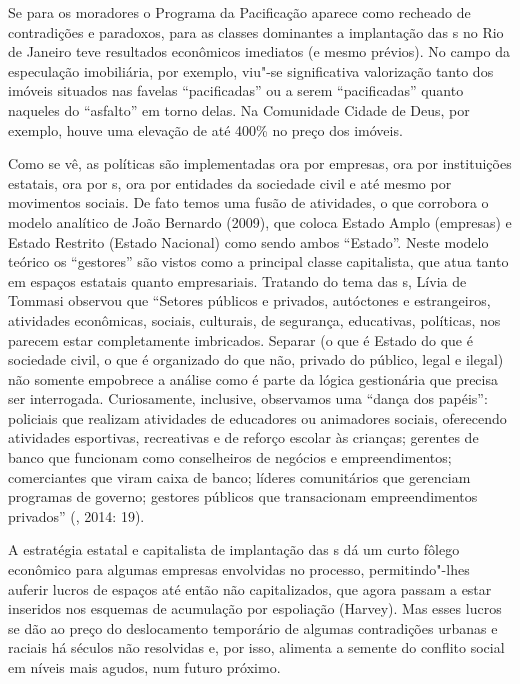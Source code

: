 Se para os moradores o Programa da Pacificação aparece como recheado de
contradições e paradoxos, para as classes dominantes a implantação das
s no Rio de Janeiro teve resultados econômicos imediatos (e mesmo
prévios). No campo da especulação imobiliária, por exemplo, viu"-se
significativa valorização tanto dos imóveis situados nas favelas
``pacificadas'' ou a serem ``pacificadas'' quanto naqueles do
``asfalto'' em torno delas. Na Comunidade Cidade de Deus, por exemplo,
houve uma elevação de até 400\% no preço dos imóveis.

Como se vê, as políticas são implementadas ora por empresas, ora por
instituições estatais, ora por s, ora por entidades da sociedade
civil e até mesmo por movimentos sociais. De fato temos uma fusão de
atividades, o que corrobora o modelo analítico de João Bernardo (2009),
que coloca Estado Amplo (empresas) e Estado Restrito (Estado Nacional)
como sendo ambos ``Estado''. Neste modelo teórico os ``gestores'' são
vistos como a principal classe capitalista, que atua tanto em espaços
estatais quanto empresariais. Tratando do tema das s, Lívia de
Tommasi observou que ``Setores públicos e privados, autóctones e
estrangeiros, atividades econômicas, sociais, culturais, de segurança,
educativas, políticas, nos parecem estar completamente imbricados.
Separar (o que é Estado do que é sociedade civil, o que é organizado do
que não, privado do público, legal e ilegal) não somente empobrece a
análise como é parte da lógica gestionária que precisa ser interrogada.
Curiosamente, inclusive, observamos uma ``dança dos papéis'': policiais
que realizam atividades de educadores ou animadores sociais, oferecendo
atividades esportivas, recreativas e de reforço escolar às crianças;
gerentes de banco que funcionam como conselheiros de negócios e
empreendimentos; comerciantes que viram caixa de banco; líderes
comunitários que gerenciam programas de governo; gestores públicos que
transacionam empreendimentos privados'' (, 2014: 19).

A estratégia estatal e capitalista de implantação das s dá um curto
fôlego econômico para algumas empresas envolvidas no processo,
permitindo"-lhes auferir lucros de espaços até então não capitalizados,
que agora passam a estar inseridos nos esquemas de acumulação por
espoliação (Harvey). Mas esses lucros se dão ao preço do deslocamento
temporário de algumas contradições urbanas e raciais há séculos não
resolvidas e, por isso, alimenta a semente do conflito social em níveis
mais agudos, num futuro próximo.

